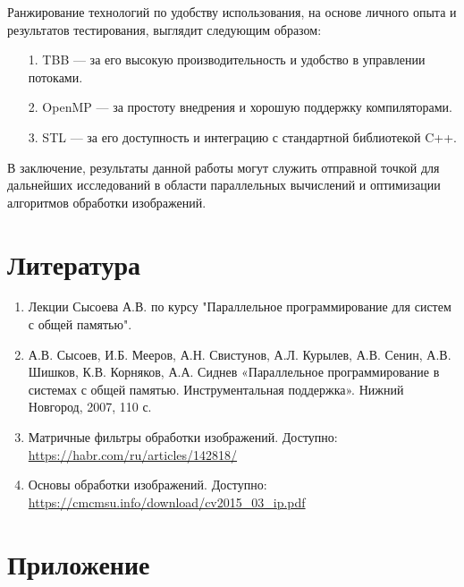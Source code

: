 \documentclass{report}
\begin{document}
\par Ранжирование технологий по удобству использования, на основе личного опыта и результатов тестирования, выглядит следующим образом:
\begin{itemize}
    \item[1.] TBB — за его высокую производительность и удобство в управлении потоками.
    \item[2.] OpenMP — за простоту внедрения и хорошую поддержку компиляторами.
    \item[3.] STL — за его доступность и интеграцию с стандартной библиотекой C++.
\end{itemize}

\par В заключение, результаты данной работы могут служить отправной точкой для дальнейших исследований в области параллельных вычислений и оптимизации алгоритмов обработки изображений.

\newpage


\section*{Литература}
\begin{enumerate}
    \item Лекции Сысоева А.В. по курсу "Параллельное программирование для систем с общей памятью".
    \item А.В. Сысоев, И.Б. Мееров, А.Н. Свистунов, А.Л. Курылев, А.В. Сенин, А.В. Шишков, К.В. Корняков, А.А. Сиднев «Параллельное программирование в системах с общей памятью. Инструментальная поддержка». Нижний Новгород, 2007, 110 с.
    \item Матричные фильтры обработки изображений. Доступно: \url{https://habr.com/ru/articles/142818/}
    \item Основы обработки изображений. Доступно: \url{https://cmcmsu.info/download/cv2015_03_ip.pdf}
\end{enumerate}

\newpage

\section*{Приложение}
\end{document}
